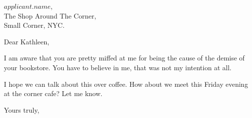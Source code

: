\documentclass[a4paper, 10pt]{letter}
\begin{document}
\begin{letter}
{
    $applicant.name$,\\
    The Shop Around The Corner,\\
    Small Corner, NYC.
}

\opening{Dear Kathleen,}


I am aware that you are pretty miffed at me for being the cause of the demise of your bookstore. You have to believe in me, that was not my intention at all.

I hope we can talk about this over coffee. How about we meet this Friday evening at the corner cafe? Let me know.

\closing{Yours truly,}

\end{letter}
\end{document}
